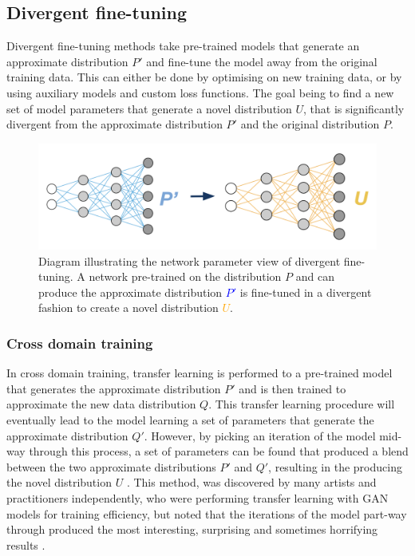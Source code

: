 \subsection{Divergent fine-tuning}
\label{survey:divergent}

Divergent fine-tuning methods take pre-trained models that generate an approximate distribution $P'$ and fine-tune the model away from the original training data. 
This can either be done by optimising on new training data, or by using auxiliary models and custom loss functions. 
The goal being to find a new set of model parameters that generate a novel distribution $U$, that is significantly divergent from the approximate distribution $P'$ and the original distribution $P$.

\begin{figure}[!htbp]
    \centering
    \includegraphics[width=1\textwidth]{figures/c6_active_div/diagrams/divergent_finetuning.png}
    \caption[Diagram illustrating the network parameter view of divergent fine-tuning.]{Diagram illustrating the network parameter view of divergent fine-tuning. A network pre-trained on the distribution $P$ and can produce the approximate distribution \textcolor{blue}{$P'$} is fine-tuned in a divergent fashion to create a novel distribution \textcolor{orange}{$U$}.}
  \label{fig:c6:divergent-finetuning}
  \end{figure}

\subsubsection{Cross domain training} 

In cross domain training, transfer learning is performed to a pre-trained model that generates the approximate distribution $P'$ and is then trained to approximate the new data distribution $Q$. 
This transfer learning procedure will eventually lead to the model learning a set of parameters that generate the approximate distribution $Q'$. 
However, by picking an iteration of the model mid-way through this process, a set of parameters can be found that produced a blend between the two approximate distributions $P'$ and $Q'$, resulting in the producing the novel distribution $U$ \citep{schultz2020mixed}. 
This method, was discovered by many artists and practitioners independently, who were performing transfer learning with GAN models for training efficiency, but noted that the iterations of the model part-way through produced the most interesting, surprising and sometimes horrifying results \citep{adler2020transfer,black2020noface,mariansky2020transfer,shane2020cat}.

